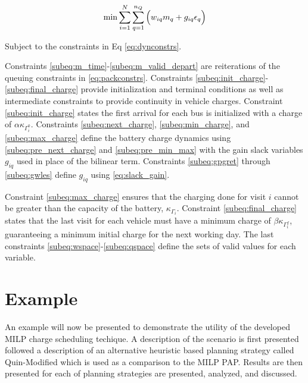 \documentclass[utf8]{FrontiersinHarvard}
\begin{document}
\begin{equation}
\label{eq:objective}
	\min \sum_{i=1}^N \sum_{q=1}^{n_Q} \Big( w_{iq} m_q + g_{iq} \epsilon_q \Big) \\
\end{equation}

Subject to the constraints in Eq \ref{eq:dynconstrs}.



Constraints \eqref{subeq:m_time}-\eqref{subeq:m_valid_depart} are reiterations of the queuing constraints in
\eqref{eq:packconstrs}. Constraints \eqref{subeq:init_charge}-\eqref{subeq:final_charge} provide initialization and
terminal conditions as well as intermediate constraints to provide continuity in vehicle charges. Constraint
\eqref{subeq:init_charge} states the first arrival for each bus is initialized with a charge of $\alpha \kappa_{\Gamma^0_i}$.
Constraints \eqref{subeq:next_charge}, \eqref{subeq:min_charge}, and \eqref{subeq:max_charge} define the battery charge
dynamics using \eqref{subeq:pre_next_charge} and \eqref{subeq:pre_min_max} with the gain slack variables $g_{iq}$ used
in place of the bilinear term. Constraints \eqref{subeq:gpgret} through \eqref{subeq:gwles} define $g_{iq}$ using
\eqref{eq:slack_gain}.

Constraint \eqref{subeq:max_charge} ensures that the charging done for visit $i$ cannot be greater than the capacity of
the battery, $\kappa_{\Gamma_i}$. Constraint \eqref{subeq:final_charge} states that the last visit for each vehicle must have a
minimum charge of $\beta \kappa_{\Gamma^f_i}$, guaranteeing a minimum initial charge for the next working day. The last constraints
\eqref{subeq:wspace}-\eqref{subeq:qspace} define the sets of valid values for each variable.

\section{Example}
\label{sec:example}

An example will now be presented to demonstrate the utility of the developed MILP charge scheduling techique. A
description of the scenario is first presented followed a description of an alternative heuristic based planning
strategy called Quin-Modified which is used as a comparison to the MILP PAP. Results are then presented for each of
planning strategies are presented, analyzed, and discussed.
\end{document}
